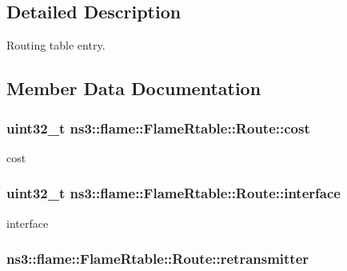 \subsection{Detailed Description}
Routing table entry. 

\subsection{Member Data Documentation}
\subsubsection[{\texorpdfstring{cost}{cost}}]{\setlength{\rightskip}{0pt plus 5cm}uint32\+\_\+t ns3\+::flame\+::\+Flame\+Rtable\+::\+Route\+::cost}\hypertarget{structns3_1_1flame_1_1FlameRtable_1_1Route_ad63929825f970a3816847f76856c5979}{}\label{structns3_1_1flame_1_1FlameRtable_1_1Route_ad63929825f970a3816847f76856c5979}


cost 

\subsubsection[{\texorpdfstring{interface}{interface}}]{\setlength{\rightskip}{0pt plus 5cm}uint32\+\_\+t ns3\+::flame\+::\+Flame\+Rtable\+::\+Route\+::interface}\hypertarget{structns3_1_1flame_1_1FlameRtable_1_1Route_af97b1bb4254176a2f495b34b7c26fc46}{}\label{structns3_1_1flame_1_1FlameRtable_1_1Route_af97b1bb4254176a2f495b34b7c26fc46}


interface 

\subsubsection[{\texorpdfstring{retransmitter}{retransmitter}}]{ ns3\+::flame\+::\+Flame\+Rtable\+::\+Route\+::retransmitter}\hypertarget{structns3_1_1flame_1_1FlameRtable_1_1Route_aa18df940013826b9e1738b822127f25f}{}\label{structns3_1_1flame_1_1FlameRtable_1_1Route_aa18df940013826b9e1738b822127f25f}


